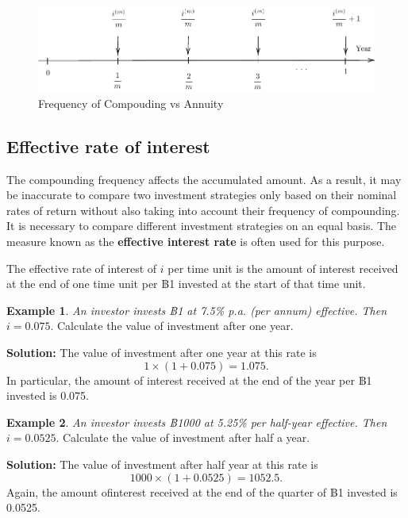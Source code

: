 \documentclass[
]{book}
\theoremstyle{definition}
\theoremstyle{definition}
\newtheorem{example}{Example}[chapter]
\theoremstyle{definition}
\theoremstyle{definition}
\theoremstyle{remark}
\begin{document}
\begin{figure}

{\centering \includegraphics{SCMA266Bookdownproj_files/figure-latex/tikz-ex4-1} 

}

\caption{Frequency of Compouding vs Annuity}\label{fig:tikz-ex4}
\end{figure}

\subsection{Effective rate of interest}\label{effective-rate-of-interest}

The compounding frequency affects the accumulated amount. As a result, it may be inaccurate to compare two investment strategies only based on their nominal rates of return without also taking into account their frequency of compounding. It is necessary to compare different investment strategies on an equal basis. The measure known as the \textbf{effective interest rate} is often used for this purpose.

The effective rate of interest of \(i\) per time unit is the amount of
interest received at the end of one time unit per ฿1 invested at the
start of that time unit.

\begin{example}
\emph{An investor invests ฿1 at 7.5\% p.a. (per annum) effective. Then}
\(i = 0.075\). Calculate the value of investment after one year.
\end{example}

\textbf{Solution:} The value of investment after one year at this rate is
\[1 \times ( 1 + 0.075) = 1.075.\]
In particular, the amount of
interest received at the end of the year per ฿1 invested is 0.075.

\begin{example}
\emph{An investor invests ฿1000 at 5.25\% per half-year effective. Then}
\(i = 0.0525\). Calculate the value of investment after half a year.
\end{example}

\textbf{Solution:} The value of investment after half year at this rate is
\[1000 \times ( 1 + 0.0525) = 1052.5.\]
Again, the amount ofinterest received at the end of the quarter of ฿1 invested is 0.0525.
\end{document}
